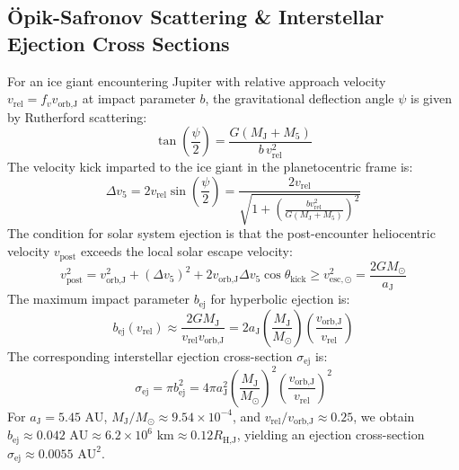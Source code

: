 \documentclass[11pt,a4paper]{article}
\begin{document}
\subsection{\"Opik-Safronov Scattering \& Interstellar Ejection Cross Sections}
For an ice giant encountering Jupiter with relative approach velocity $v_{\text{rel}} = f_v v_{\text{orb,J}}$ at impact parameter $b$, the gravitational deflection angle $\psi$ is given by Rutherford scattering:
\begin{equation}
\tan\left(\frac{\psi}{2}\right) = \frac{G (M_{\text{J}} + M_5)}{b \, v_{\text{rel}}^2}
\end{equation}
The velocity kick imparted to the ice giant in the planetocentric frame is:
\begin{equation}
\Delta v_5 = 2 v_{\text{rel}} \sin\left(\frac{\psi}{2}\right) = \frac{2 v_{\text{rel}}}{\sqrt{1 + \left(\frac{b v_{\text{rel}}^2}{G (M_{\text{J}} + M_5)}\right)^2}}
\end{equation}
The condition for solar system ejection is that the post-encounter heliocentric velocity $v_{\text{post}}$ exceeds the local solar escape velocity:
\begin{equation}
v_{\text{post}}^2 = v_{\text{orb,J}}^2 + (\Delta v_5)^2 + 2 v_{\text{orb,J}} \Delta v_5 \cos\theta_{\text{kick}} \ge v_{\text{esc},\odot}^2 = \frac{2 G M_\odot}{a_{\text{J}}}
\end{equation}
The maximum impact parameter $b_{\text{ej}}$ for hyperbolic ejection is:
\begin{equation}
b_{\text{ej}}(v_{\text{rel}}) \approx \frac{2 G M_{\text{J}}}{v_{\text{rel}} v_{\text{orb,J}}} = 2 a_{\text{J}} \left(\frac{M_{\text{J}}}{M_\odot}\right) \left(\frac{v_{\text{orb,J}}}{v_{\text{rel}}}\right)
\end{equation}
The corresponding interstellar ejection cross-section $\sigma_{\text{ej}}$ is:
\begin{equation}
\sigma_{\text{ej}} = \pi b_{\text{ej}}^2 = 4 \pi a_{\text{J}}^2 \left(\frac{M_{\text{J}}}{M_\odot}\right)^2 \left(\frac{v_{\text{orb,J}}}{v_{\text{rel}}}\right)^2
\end{equation}
For $a_{\text{J}} = 5.45\text{ AU}$, $M_{\text{J}}/M_\odot \approx 9.54 \times 10^{-4}$, and $v_{\text{rel}} / v_{\text{orb,J}} \approx 0.25$, we obtain $b_{\text{ej}} \approx 0.042\text{ AU} \approx 6.2 \times 10^6\text{ km} \approx 0.12 R_{\text{H,J}}$, yielding an ejection cross-section $\sigma_{\text{ej}} \approx 0.0055\text{ AU}^2$.
\end{document}
